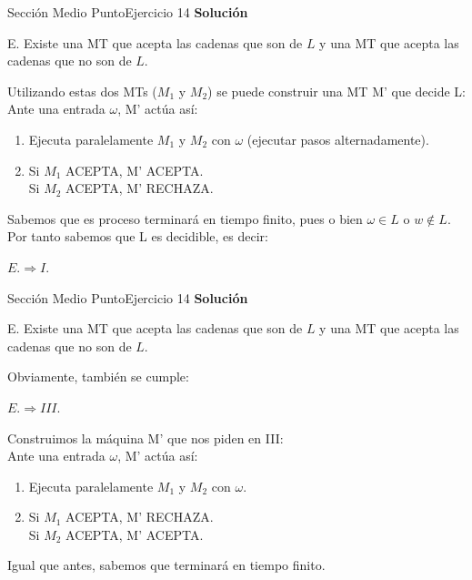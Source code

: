 \documentclass[10pt, envcountsect, presentation, aspectratio=169]{beamer}
\begin{document}
\begin{frame}{Sección Medio Punto}{Ejercicio 14}
    \textbf{Solución}\\
     \begin{center}
        E. Existe una MT que acepta las cadenas que son de $L$ y una MT que acepta las cadenas que no son de $L$.   
    \end{center}
    Utilizando estas dos MTs ($M_1$ y $M_2$) se puede construir una MT M' que decide L:
    Ante una entrada $\omega$, M' actúa así:
    \begin{enumerate}[1.] 
        \item Ejecuta paralelamente $M_1$ y $M_2$ con $\omega$ (ejecutar pasos alternadamente). 
        \item   Si $M_1$ ACEPTA, M' ACEPTA.\\
                Si $M_2$ ACEPTA, M' RECHAZA.
    \end{enumerate}
        
    \vspace{3mm}
    Sabemos que es proceso terminará en tiempo finito, pues o bien $\omega \in L$ o $w \notin L$.
    Por tanto sabemos que L es decidible, es decir:
    \begin{center}
        $E. \Rightarrow I.$
    \end{center}
\end{frame}

\begin{frame}{Sección Medio Punto}{Ejercicio 14}
    \textbf{Solución}\\
     \begin{center}
        E. Existe una MT que acepta las cadenas que son de $L$ y una MT que acepta las cadenas que no son de $L$.   
    \end{center}
    Obviamente, también se cumple: 
    \begin{center}
        $E. \Rightarrow III.$
    \end{center}
    Construimos la máquina M' que nos piden en III:\\
    Ante una entrada $\omega$, M' actúa así:
    \begin{enumerate}[1.] 
        \item Ejecuta paralelamente $M_1$ y $M_2$ con $\omega$. 
        \item   Si $M_1$ ACEPTA, M' RECHAZA.\\
                Si $M_2$ ACEPTA, M' ACEPTA.
    \end{enumerate}

    \vspace{3mm}
    Igual que antes, sabemos que terminará en tiempo finito.
    
\end{frame}
\end{document}
